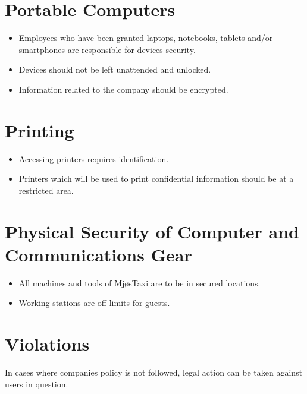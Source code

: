 \section{Portable Computers}
\vspace{-0.4em}
    \begin{itemize}[noitemsep]
        \item Employees who have been granted laptops, notebooks, tablets and/or smartphones are responsible for devices security.
        \item Devices should not be left unattended and unlocked.
        \item Information related to the company should be encrypted.

    \end{itemize}{}
    

\section{Printing}
\vspace{-0.4em}
    \begin{itemize}[noitemsep]
        \item Accessing printers requires identification.
        \item Printers which will be used to print confidential information should be at a restricted area.
    \end{itemize}{}
    

\section{Physical Security of Computer and Communications Gear}
\vspace{-0.4em}
    \begin{itemize}[noitemsep]
        \item All machines and tools of MjøsTaxi are to be in secured locations.
        \item Working stations are off-limits for guests.

    \end{itemize}{}
    

\section{Violations}
In cases where companies policy is not followed, legal action can be taken against users in question.